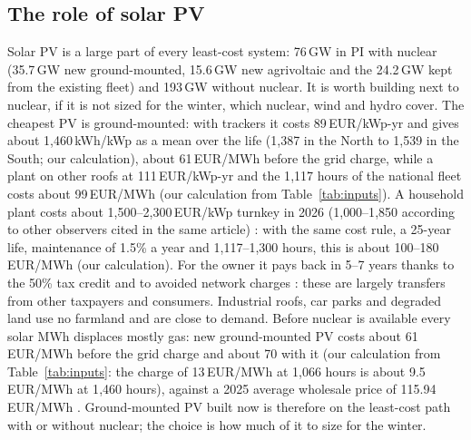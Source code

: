 \subsection{The role of solar PV}\label{sec:pv}
Solar PV is a large part of every least-cost system: 76\,GW in PI with nuclear (35.7\,GW new ground-mounted, 15.6\,GW new agrivoltaic and the 24.2\,GW kept from the existing fleet) and 193\,GW without nuclear. It is worth building next to nuclear, if it is not sized for the winter, which nuclear, wind and hydro cover. The cheapest PV is ground-mounted: with trackers it costs 89\,EUR/kWp-yr and gives about 1{,}460\,kWh/kWp as a mean over the life (1{,}387 in the North to 1{,}539 in the South; our calculation), about 61\,EUR/MWh before the grid charge, while a plant on other roofs at 111\,EUR/kWp-yr and the 1{,}117 hours of the national fleet costs about 99\,EUR/MWh (our calculation from Table~\ref{tab:inputs}). A household plant costs about 1{,}500--2{,}300\,EUR/kWp turnkey in 2026 (1{,}000--1{,}850 according to other observers cited in the same article) \citep{MoneyPV2026}: with the same cost rule, a 25-year life, maintenance of 1.5\% a year and 1{,}117--1{,}300 hours, this is about 100--180\,EUR/MWh (our calculation). For the owner it pays back in 5--7 years thanks to the 50\% tax credit and to avoided network charges \citep{MoneyPV2026}: these are largely transfers from other taxpayers and consumers. Industrial roofs, car parks and degraded land use no farmland and are close to demand. Before nuclear is available every solar MWh displaces mostly gas: new ground-mounted PV costs about 61\,EUR/MWh before the grid charge and about 70 with it (our calculation from Table~\ref{tab:inputs}: the charge of 13\,EUR/MWh at 1{,}066 hours is about 9.5\,EUR/MWh at 1{,}460 hours), against a 2025 average wholesale price of 115.94\,EUR/MWh \citep{GME2025}. Ground-mounted PV built now is therefore on the least-cost path with or without nuclear; the choice is how much of it to size for the winter.

